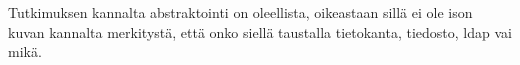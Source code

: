 Tutkimuksen kannalta abstraktointi on oleellista, oikeastaan sillä ei ole ison kuvan kannalta merkitystä, että onko siellä taustalla tietokanta, tiedosto, ldap vai mikä.